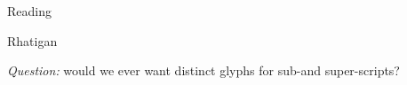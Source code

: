 \documentclass[11pt]{PalisadesLakesBook}
\begin{document}
\begin{plSection}{Reading}
\begin{plSection}{Rhatigan}
\begin{plSection}{}
\begin{plSection}{}
\emph{Question:} would we ever want distinct glyphs 
for sub-and super-scripts?

\end{plSection}%
\begin{plSection}{}
\end{plSection}%
\begin{plSection}{}
\end{plSection}%
\end{plSection}%
\end{plSection}%
\begin{plSection}{}
\end{plSection}%
\begin{plSection}{}
\end{plSection}%
\end{plSection}%
\end{document}
